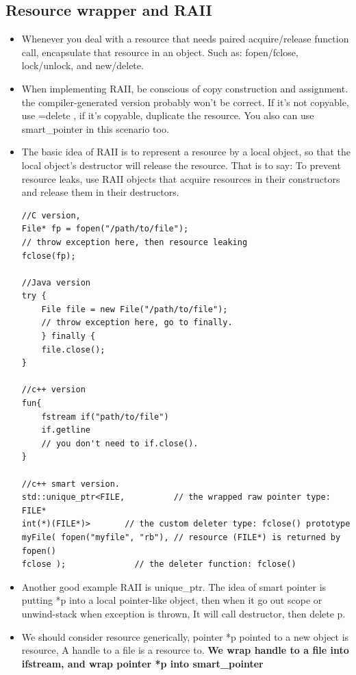 \documentclass[a4paper,11pt,twoside]{book}
\begin{document}
\subsection{Resource wrapper and RAII}
\begin{itemize}
	\item Whenever you deal with a resource that needs paired acquire/release function call, encapsulate that resource in an object.  Such as: fopen/fclose, lock/unlock, and new/delete.
	
	\item When implementing RAII, be conscious of copy construction and assignment. the compiler-generated version probably won't be correct. If it's not copyable, use =delete , if it's copyable, duplicate the resource.  You also can use smart\_pointer in this scenario too.
	
	\item The basic idea of RAII  is to represent a resource by a local object, so that the local object's destructor will release the resource.  That is to say: To prevent resource leaks, use RAII objects that acquire resources in their constructors and release them in their destructors.
\begin{lstlisting}[numbers=none]
//C version,
File* fp = fopen("/path/to/file");
// throw exception here, then resource leaking
fclose(fp);
	
//Java version
try {
	File file = new File("/path/to/file");
	// throw exception here, go to finally.
	} finally {
	file.close();
}
	
//c++ version
fun{
	fstream if("path/to/file")
	if.getline
	// you don't need to if.close().
}

//c++ smart version.
std::unique_ptr<FILE,          // the wrapped raw pointer type: FILE*
int(*)(FILE*)>       // the custom deleter type: fclose() prototype
myFile( fopen("myfile", "rb"), // resource (FILE*) is returned by fopen()
fclose );              // the deleter function: fclose()
\end{lstlisting}
	
	\item Another good example RAII is unique\_ptr. The idea of smart pointer is putting *p into a local pointer-like object, then when it go out scope or unwind-stack when exception is thrown, It will call destructor, then delete p.
	
	\item We should consider resource generically, pointer *p pointed to a new object is resource, A handle to a file is a resource to. \textbf{We wrap handle to a file into ifstream, and wrap pointer *p into smart\_pointer}
	

\end{itemize}
\end{document}
